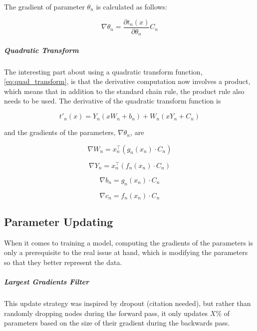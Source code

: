 \documentclass{article}
\begin{document}
The gradient of parameter $\theta_n$ is calculated as follows:

\begin{equation}
\nabla\theta_n = \frac{\partial t_n(x)}{\partial \theta_n} C_n
\end{equation}

\subparagraph{Quadratic Transform}

The interesting part about using a quadratic transform function, \eqref{eq:quad_transform}, is that the derivative computation now involves a product, which means that in addition to the standard chain rule, the product rule also needs to be used. The derivative of the quadratic transform function is

\begin{equation} \label{eq:quad_transform_prime}
t'_n(x) = Y_n(x W_n + b_n) + W_n (x Y_n + C_n)
\end{equation}

and the gradients of the parameters, $\nabla\theta_n$, are

\begin{equation} \label{eq:w_grad}
\nabla W_n = x_n^\top (g_n(x_n) \cdot C_n)
\end{equation}

\begin{equation} \label{eq:y_grad}
\nabla Y_n = x_n^\top (f_n(x_n) \cdot C_n)
\end{equation}

\begin{equation} \label{eq:b_grad}
\nabla b_n = g_n(x_n) \cdot C_n
\end{equation}

\begin{equation} \label{eq:c_grad}
\nabla c_n = f_n(x_n) \cdot C_n
\end{equation}

\subsection{Parameter Updating}

When it comes to training a model, computing the gradients of the parameters is only a prerequisite to the real issue at hand, which is modifying the parameters so that they better represent the data. 

\subparagraph{Largest Gradients Filter}

This update strategy was inspired by dropout (citation needed), but rather than randomly dropping nodes during the forward pass, it only updates $X\%$ of parameters based on the size of their gradient during the backwards pass.
\end{document}
